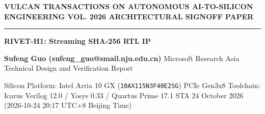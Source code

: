 \documentclass[11pt,a4paper]{article}
\begin{document}
{\scriptsize\sffamily\textcolor{vulcan}{\textbf{VULCAN TRANSACTIONS ON AUTONOMOUS AI-TO-SILICON ENGINEERING \hfill VOL. 2026 \textperiodcentered{} ARCHITECTURAL SIGNOFF PAPER}}\par}

\vspace{1pt}\textcolor{vulcan}{\rule{\textwidth}{1.2pt}}\vspace{4pt}

\begin{center}

{\sffamily\LARGE\bfseries RIVET-H1: Streaming SHA-256 RTL IP\par}\vspace{3pt}

{\small\sffamily\textbf{Sufeng Guo (\allowbreak{}sufeng\_\allowbreak{}guo@smail.nju.edu.cn)\allowbreak{}} \textperiodcentered{} Microsoft Research Asia \textperiodcentered{} Technical Design and Verification Report\par}\vspace{1pt}

{\scriptsize\sffamily\textcolor{black!75}{Silicon Platform: Intel Arria 10 GX (\texttt{10AX115N3F40E2SG}) PCIe Gen3x8 \textperiodcentered{} Toolchain: Icarus Verilog 12.0 / Yosys 0.33 / Quartus Prime 17.1 STA \textperiodcentered{} 24 October 2026 (\allowbreak{}2026-10-24 20:17 UTC+\allowbreak{}8 Beijing Time)\allowbreak{}}\par}

\end{center}\vspace{2pt}
\end{document}
